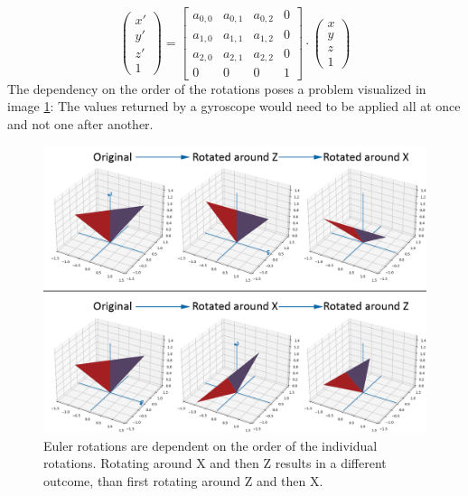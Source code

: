 \begin{equation*}
    \begin{pmatrix}
        x' \\
        y' \\
        z' \\
        1
    \end{pmatrix}
    =
    \begin{bmatrix}
        a_{0,0} & a_{0,1} & a_{0,2} & 0 \\
        a_{1,0} & a_{1,1} & a_{1,2} & 0 \\
        a_{2,0} & a_{2,1} & a_{2,2} & 0 \\
        0       & 0       & 0       & 1
    \end{bmatrix}
    \cdot
    \begin{pmatrix}
        x \\
        y \\
        z \\
        1
    \end{pmatrix}
\end{equation*}
The dependency on the order of the rotations poses a problem visualized in image \ref{im:EulerRotation}: The values returned by a gyroscope would need to be applied all at once and not one after another.
\begin{figure}[H]
    \centering
    \includegraphics[width=1.0\textwidth]{images/euler_rotation.png}
    \caption{Euler rotations are dependent on the order of the individual rotations. Rotating around X and then Z results in a different outcome, than first rotating around Z and then X.}
    \label{im:EulerRotation}
\end{figure}
